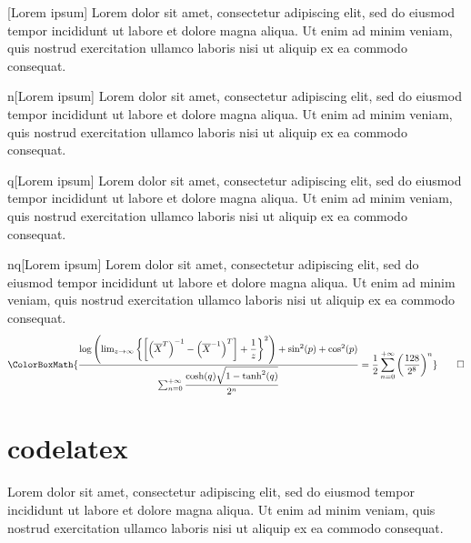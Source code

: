 \begin{conjecture}{}[Lorem ipsum]
	Lorem dolor sit amet, consectetur adipiscing elit, sed do eiusmod tempor incididunt ut labore et dolore magna aliqua. Ut enim ad minim veniam, quis nostrud exercitation ullamco laboris nisi ut aliquip ex ea commodo consequat.
\end{conjecture}

\begin{conjecture}{n}[Lorem ipsum]
	Lorem dolor sit amet, consectetur adipiscing elit, sed do eiusmod tempor incididunt ut labore et dolore magna aliqua. Ut enim ad minim veniam, quis nostrud exercitation ullamco laboris nisi ut aliquip ex ea commodo consequat.
\end{conjecture}

\begin{conjecture}{q}[Lorem ipsum]
	Lorem dolor sit amet, consectetur adipiscing elit, sed do eiusmod tempor incididunt ut labore et dolore magna aliqua. Ut enim ad minim veniam, quis nostrud exercitation ullamco laboris nisi ut aliquip ex ea commodo consequat.
\end{conjecture}

\begin{conjecture}{nq}[Lorem ipsum]
	Lorem dolor sit amet, consectetur adipiscing elit, sed do eiusmod tempor incididunt ut labore et dolore magna aliqua. Ut enim ad minim veniam, quis nostrud exercitation ullamco laboris nisi ut aliquip ex ea commodo consequat.
	\begin{equation*}
		\ColorBoxMath{\dfrac{\log\left(\lim_{z\to\infty}\left\{\left[\left(\overline{X}^{T}\right)^{-1}-\left(\overline{X}^{-1}\right)^T\right]+\dfrac{1}{z}\right\}^2\right)+\sin^2(p)+\cos^2(p)}{\sum_{n=0}^{+\infty}\dfrac{\cosh(q)\sqrt{1-\tanh^2(q)}}{2^n}}=\dfrac{1}{2}\sum_{n=0}^{+\infty}\left(\dfrac{128}{2^8}\right)^n}\qedhere
	\end{equation*}
\end{conjecture}

\newpage

\section{codelatex}

\begin{codelatex}
	Lorem dolor sit amet, consectetur adipiscing elit, sed do eiusmod tempor incididunt ut labore et dolore magna aliqua. Ut enim ad minim veniam, quis nostrud exercitation ullamco laboris nisi ut aliquip ex ea commodo consequat.
\end{codelatex}

